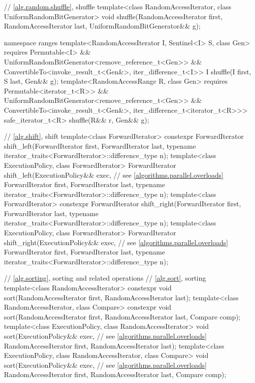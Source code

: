 \begin{codeblock}
{  // \ref{alg.random.shuffle}, shuffle
  template<class RandomAccessIterator, class UniformRandomBitGenerator>
    void shuffle(RandomAccessIterator first,
                 RandomAccessIterator last,
                 UniformRandomBitGenerator&& g);

  namespace ranges {
    template<RandomAccessIterator I, Sentinel<I> S, class Gen>
      requires Permutable<I> &&
        UniformRandomBitGenerator<remove_reference_t<Gen>> &&
        ConvertibleTo<invoke_result_t<Gen&>, iter_difference_t<I>>
      I shuffle(I first, S last, Gen&& g);
    template<RandomAccessRange R, class Gen>
      requires Permutable<iterator_t<R>> &&
        UniformRandomBitGenerator<remove_reference_t<Gen>> &&
        ConvertibleTo<invoke_result_t<Gen&>, iter_difference_t<iterator_t<R>>>
      safe_iterator_t<R>
        shuffle(R&& r, Gen&& g);
  }

  // \ref{alg.shift}, shift
  template<class ForwardIterator>
    constexpr ForwardIterator
      shift_left(ForwardIterator first, ForwardIterator last,
                 typename iterator_traits<ForwardIterator>::difference_type n);
  template<class ExecutionPolicy, class ForwardIterator>
    ForwardIterator
      shift_left(ExecutionPolicy&& exec, // see \ref{algorithms.parallel.overloads}
                 ForwardIterator first, ForwardIterator last,
                 typename iterator_traits<ForwardIterator>::difference_type n);
  template<class ForwardIterator>
    constexpr ForwardIterator
      shift_right(ForwardIterator first, ForwardIterator last,
                  typename iterator_traits<ForwardIterator>::difference_type n);
  template<class ExecutionPolicy, class ForwardIterator>
    ForwardIterator
      shift_right(ExecutionPolicy&& exec, // see \ref{algorithms.parallel.overloads}
                  ForwardIterator first, ForwardIterator last,
                  typename iterator_traits<ForwardIterator>::difference_type n);

  // \ref{alg.sorting}, sorting and related operations
  // \ref{alg.sort}, sorting
  template<class RandomAccessIterator>
    constexpr void sort(RandomAccessIterator first, RandomAccessIterator last);
  template<class RandomAccessIterator, class Compare>
    constexpr void sort(RandomAccessIterator first, RandomAccessIterator last,
                        Compare comp);
  template<class ExecutionPolicy, class RandomAccessIterator>
    void sort(ExecutionPolicy&& exec, // see \ref{algorithms.parallel.overloads}
              RandomAccessIterator first, RandomAccessIterator last);
  template<class ExecutionPolicy, class RandomAccessIterator, class Compare>
    void sort(ExecutionPolicy&& exec, // see \ref{algorithms.parallel.overloads}
              RandomAccessIterator first, RandomAccessIterator last,
              Compare comp);

}
\end{codeblock}
